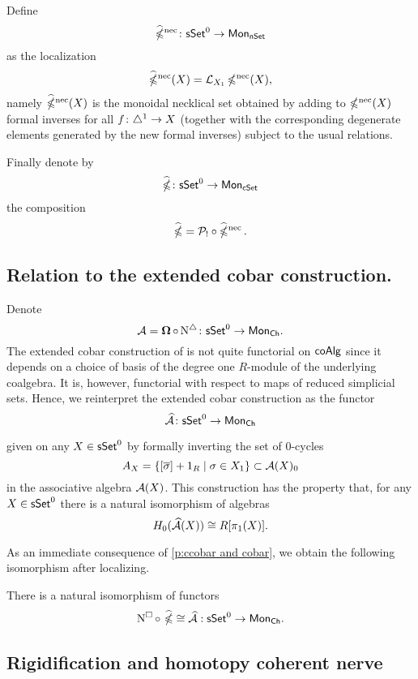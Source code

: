 Define 
$$\operatorname{\widehat{\mathbb{\Omega}}^{\mathrm{nec}}} \colon \mathsf{sSet}^0 \to \mathsf{Mon}_{\mathsf{nSet}}$$
as the localization
$$\operatorname{\widehat{\mathbb{\Omega}}^{\mathrm{nec}}}(X)= \mathcal{L}_{X_1} \operatorname{\mathbb{\Omega}^{\mathrm{nec}}}(X),$$
namely $\operatorname{\widehat{\mathbb{\Omega}}^{\mathrm{nec}}}(X)$ is the monoidal necklical set obtained by adding to $\operatorname{\mathbb{\Omega}^{\mathrm{nec}}}(X)$  formal inverses for all $f\colon \triangle^1 \to X$ (together with the corresponding degenerate elements generated by the new formal inverses) subject to the usual relations.

Finally denote by $$\widehat{\operatorname{\mathbb{\Omega}}} \colon \mathsf{sSet}^0 \to \mathsf{Mon}_{\mathsf{cSet}}$$ the composition $$\widehat{\operatorname{\mathbb{\Omega}}}= \mathcal{P}_{!} \circ \operatorname{\widehat{\mathbb{\Omega}}^{\mathrm{nec}}}.$$ 

\subsection{Relation to the extended cobar construction.}

Denote $$\operatorname{\mathcal{A}}= \operatorname{\mathbf{\Omega}} \circ \operatorname{N^{\triangle}} \colon \mathsf{sSet}^0 \to \mathsf{Mon}_{\mathsf{Ch}}.$$ The extended cobar construction of \cite{hess2010cobar} is not quite functorial on $\mathsf{coAlg}$ since it depends on a choice of basis of the degree one $R$-module of the underlying coalgebra.
It is, however, functorial with respect to maps of reduced simplicial sets.
Hence, we reinterpret the extended cobar construction as the functor
\begin{equation*}
\operatorname{\mathcal{\widehat{A}}} \colon \mathsf{sSet}^0 \to \mathsf{Mon}_{\mathsf{Ch}}
\end{equation*}

given on any $X \in \mathsf{sSet}^0$ by formally inverting the set of $0$-cycles
\begin{equation*}
A_X = \{ [\overline{\sigma}]+1_R \mid \sigma \in X_1 \} \subset \operatorname{\mathcal{A}}(X)_0
\end{equation*}
in the associative algebra $\operatorname{\mathcal{A}}(X)$.
This construction has the property that, for any $X \in \mathsf{sSet}^0$ there is a natural isomorphism of algebras
\begin{equation*}
H_0(\operatorname{\mathcal{\widehat{A}}}(X)) \cong R[\pi_1(X)].
\end{equation*}

As an immediate consequence of \cref{p:ccobar and cobar}, we obtain the following isomorphism after localizing.

\begin{corollary}
	There is a natural isomorphism of functors
	$$\operatorname{N^{\square}} \circ\ \widehat{\operatorname{\mathbb{\Omega}}} \cong \operatorname{\mathcal{\widehat{A}}} :\mathsf{sSet}^0 \to \mathsf{Mon}_{\mathsf{Ch}}.$$ 
\end{corollary}

\subsection{Rigidification and homotopy coherent nerve}

